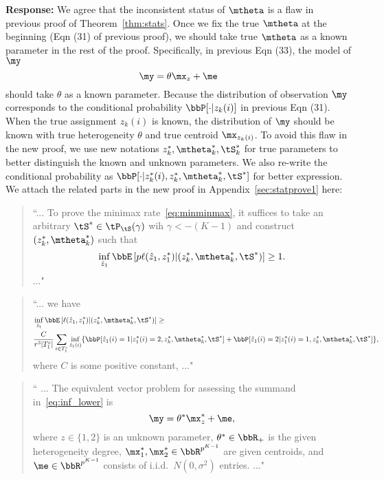 \documentclass[11pt]{article}
\theoremstyle{definition}
\theoremstyle{definition}
\begin{document}
\begin{enumerate}
\begin{enumerate}[wide]
\begin{itemize}
        \textbf{Response:} We agree that the inconsistent status of $\mtheta$ is a flaw in previous proof of Theorem~\ref{thm:stats}. Once we fix the true $\mtheta$ at the beginning (Eqn (31) of previous proof), we should take true $\mtheta$ as a known parameter in the rest of the proof. Specifically, in previous Eqn (33), the model of $\my$
        \begin{equation}
            \my = \theta \mx_z + \me
        \end{equation}
        should take $\theta$ as a known parameter. Because the distribution of observation $\my$ corresponds to the conditional probability $\bbP[\cdot | z_k(i)]$ in previous Eqn (31). When the true assignment $z_k(i)$ is known, the distribution of $\my$ should be known with true heterogeneity $\theta$ and true centroid $\mx_{z_k(i)}$. To avoid this flaw in the new proof, we use new notations $z^*_k, \mtheta^*_k, \tS^*_k$ for true parameters to better distinguish the known and unknown parameters. We also re-write the conditional probability as $\bbP[\cdot | z^*_k(i), z_k^*, \mtheta^*_k, \tS^*]$ for better expression.  We attach the related parts in the new proof in Appendix~\ref{sec:statprove1} here:
        
        \begin{quote}
            ``...
            To prove the minimax rate~\eqref{eq:minminmax}, it suffices to take an arbitrary $\tS^* \in  \tP_{\tS}(\gamma)$ wih $\gamma < -(K-1)$ and construct $(z^*_k, \mtheta^*_k)$ such that 
   \begin{equation}
       \inf_{\hat z_1} \bbE \left[ p\ell(\hat z_1, z_1^*) | (z^*_k, \mtheta^*_k, \tS^*)  \right]\geq 1.
   \end{equation}
   ..."
        \end{quote}
        
        \begin{quote}
            ``... we have 
   \begin{align}
        & \inf_{\hat z_1 } \bbE \left[ \ell(\hat z_1, z_1^*) | (z^*_k, \mtheta^*_k, \tS^*)  \right] \geq  \\
        & \frac{C}{r^3 |T_1^c|} \sum_{i \in T_1^c} \inf_{\hat z_1  (i)} \{ \bbP[\hat z_1(i) = 1| z_1^*(i) = 2, z_k^*, \mtheta_k^*, \tS^*] +   \bbP[\hat z_1(i) = 2| z_1^*(i) = 1, z_k^*, \mtheta_k^*, \tS^*] \},
   \end{align}
    where $C$ is some positive constant, ..."
        \end{quote}
        
        \begin{quote}
            `` ...  The equivalent vector problem for assessing the summand in~\eqref{eq:inf_lower} is
\begin{equation}
\my=\theta^* \mx_{z}^*+\me,
\end{equation}
where $z\in \{1,2\}$ is an unknown parameter, $\theta^* \in \bbR_+$ is the given heterogeneity degree, $\mx_1^*,\mx_2^*\in\bbR^{p^{K-1}}$ are given centroids, and $\me\in\bbR^{p^{K-1}}$ consists of i.i.d.\ $N(0,\sigma^2)$ entries.  ..."
        \end{quote}
        

\end{itemize}
\end{enumerate}
\end{enumerate}
\end{document}
